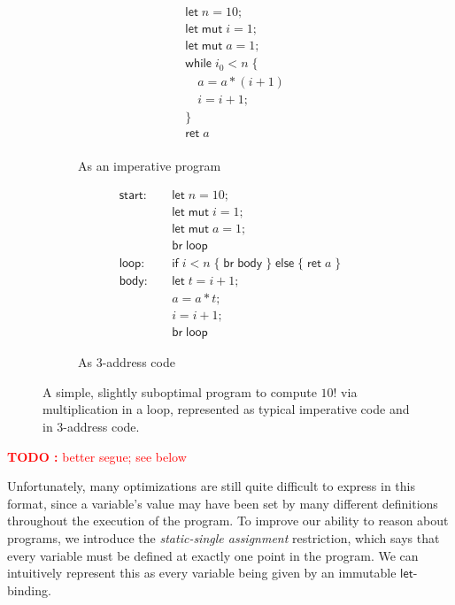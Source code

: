 \documentclass[acmsmall,screen,review]{acmart}
\newcounter{todos}
\newcommand{\TODO}[1]{{
  \stepcounter{todos}
  \begin{center}\large{\textcolor{red}{\textbf{TODO \arabic{todos}:} #1}}\end{center}
}}
\newcommand{\ms}[1]{\ensuremath{\mathsf{#1}}}
\begin{document}
\begin{figure}
  \begin{subfigure}[t]{.5\textwidth}
    \begin{align*}
      & \ms{let}\;n = 10; \\
      & \ms{let\;mut}\;i = 1; \\
      & \ms{let\;mut}\;a = 1; \\
      & \ms{while}\;i_0 < n\;\{ \\
      & \quad a = a * (i + 1) \\
      & \quad i = i + 1; \\
      & \} \\
      & \ms{ret}\;a \\
    \end{align*}
    \caption{As an imperative program}
    \label{fig:fact-imp}
  \end{subfigure}%
  \begin{subfigure}[t]{.5\textwidth}
    \begin{align*}
      \ms{start}:\quad  & \ms{let}\;n = 10; \\
                        & \ms{let\;mut}\;i = 1; \\
                        & \ms{let\;mut}\;a = 1; \\
                        & \ms{br}\;\ms{loop} \\
      \ms{loop}: \quad  & \ms{if}\;i < n\;
                          \{\;\ms{br}\;\ms{body}\;\}\;
                          \ms{else}\;\{\;\ms{ret}\;a\;\} \\
      \ms{body}: \quad  & \ms{let}\;t = i + 1; \\
                        & a = a * t; \\
                        & i = i + 1; \\
                        & \ms{br}\;\ms{loop}
    \end{align*}
    \caption{As 3-address code}
    \label{fig:fact-3addr}
  \end{subfigure}
  \caption{
    A simple, slightly suboptimal program to compute $10!$ via multiplication in a loop, represented
    as typical imperative code and in 3-address code.
  }
  \Description{}
  \label{fig:fact-program}
\end{figure}

\TODO{better segue; see below}

Unfortunately, many optimizations are still quite difficult to express in this format, since a
variable's value may have been set by many different definitions throughout the execution of the
program. To improve our ability to reason about programs, we introduce the \textit{static-single
assignment} restriction, which says that every variable must be defined at exactly one point in the
program. We can intuitively represent this as every variable being given by an immutable
\ms{let}-binding.
\end{document}
